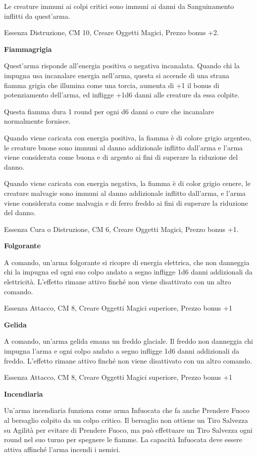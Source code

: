 \documentclass[a4paper,11pt,twoside,openany]{book}
\begin{document}
{Le creature immuni ai colpi critici sono immuni ai danni da Sanguinamento inflitti da quest'arma.

Essenza Distruzione, CM 10, Creare Oggetti Magici, Prezzo bonus +2.

\textbf{Fiammagrigia}

Quest’arma risponde all'energia positiva o negativa incanalata. Quando chi la impugna usa incanalare energia nell'arma, questa si accende di una strana fiamma grigia che illumina come una torcia, aumenta di +1 il bonus di potenziamento dell'arma, ed infligge +1d6 danni alle creature da essa colpite.

Questa fiamma dura 1 round per ogni d6 danni o cure che incanalare normalmente fornisce.

Quando viene caricata con energia positiva, la fiamma è di colore grigio argenteo, le creature buone sono immuni al danno addizionale inflitto dall'arma e l’arma viene considerata come buona e di argento ai fini di superare la riduzione del danno.

Quando viene caricata con energia negativa, la fiamma è di color grigio cenere, le creature malvagie sono immuni al danno addizionale inflitto dall'arma, e l'arma viene considerata come malvagia e di ferro freddo ai fini di superare la riduzione del danno.

Essenza Cura o Distruzione, CM 6, Creare Oggetti Magici, Prezzo bonus +1.

\textbf{Folgorante}

A comando, un'arma folgorante si ricopre di energia elettrica, che non danneggia chi la impugna ed ogni suo colpo andato a segno infligge 1d6 danni addizionali da elettricità. L'effetto rimane attivo finché non viene disattivato con un altro comando.

Essenza Attacco, CM 8, Creare Oggetti Magici superiore, Prezzo bonus +1

\textbf{Gelida}

A comando, un'arma gelida emana un freddo glaciale. Il freddo non danneggia chi impugna l'arma e ogni colpo andato a segno infligge 1d6 danni addizionali da freddo. L'effetto rimane attivo finché non viene disattivato con un altro comando.

Essenza Attacco, CM 8, Creare Oggetti Magici superiore, Prezzo bonus +1

\textbf{Incendiaria}

Un'arma incendiaria funziona come arma Infuocata che fa anche Prendere Fuoco al bersaglio colpito da un colpo critico. Il bersaglio non ottiene un Tiro Salvezza su Agilità per evitare di Prendere Fuoco, ma può effettuare un Tiro Salvezza ogni round nel suo turno per spegnere le fiamme. La capacità Infuocata deve essere attiva affinché l'arma incendi i nemici.

}
\end{document}

